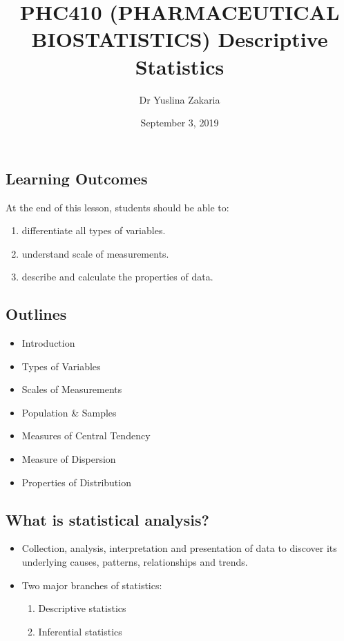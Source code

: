 \documentclass[]{article}
\title{PHC410 (PHARMACEUTICAL BIOSTATISTICS) Descriptive Statistics}
\author{Dr Yuslina Zakaria}
\date{September 3, 2019}
\providecommand{\tightlist}{%
  \setlength{\itemsep}{0pt}\setlength{\parskip}{0pt}}
\begin{document}
\maketitle

\hypertarget{learning-outcomes}{%
\subsection{Learning Outcomes}\label{learning-outcomes}}

At the end of this lesson, students should be able to:

\begin{enumerate}
\def\labelenumi{\arabic{enumi}.}
\tightlist
\item
  differentiate all types of variables.
\item
  understand scale of measurements.
\item
  describe and calculate the properties of data.
\end{enumerate}

\hypertarget{outlines}{%
\subsection{Outlines}\label{outlines}}

\begin{itemize}
\tightlist
\item
  Introduction
\item
  Types of Variables
\item
  Scales of Measurements
\item
  Population \& Samples
\item
  Measures of Central Tendency
\item
  Measure of Dispersion
\item
  Properties of Distribution
\end{itemize}

\hypertarget{what-is-statistical-analysis}{%
\subsection{What is statistical
analysis?}\label{what-is-statistical-analysis}}

\begin{itemize}
\item
  Collection, analysis, interpretation and presentation of data to
  discover its underlying causes, patterns, relationships and trends.
\item
  Two major branches of statistics:

  \begin{enumerate}
  \def\labelenumi{\arabic{enumi}.}
  \tightlist
  \item
    Descriptive statistics
  \item
    Inferential statistics
  \end{enumerate}
\end{itemize}
\end{document}
